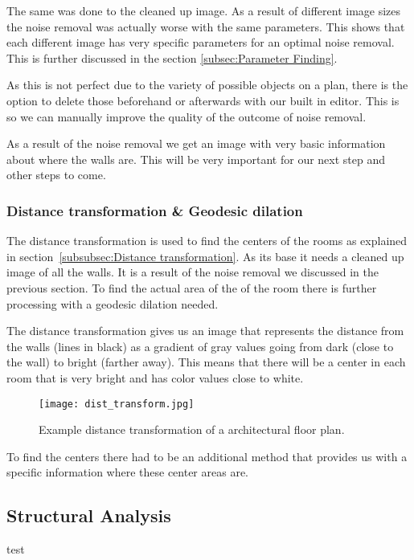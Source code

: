 The same was done to the cleaned up image. As a result of different image sizes the noise removal was actually worse with the same parameters. This shows that each different image has very specific parameters for an optimal noise removal. This is further discussed in the section \ref{subsec:Parameter Finding}.

As this is not perfect due to the variety of possible objects on a plan, there is the option to delete those beforehand or afterwards with our built in editor. This is so we can manually improve the quality of the outcome of noise removal.

As a result of the noise removal we get an image with very basic information about where the walls are. This will be very important for our next step and other steps to come.

\subsubsection{Distance transformation \& Geodesic dilation}
The distance transformation is used to find the centers of the rooms as explained in section~\ref{subsubsec:Distance transformation}. As its base it needs a cleaned up image of all the walls. It is a result of the noise removal we discussed in the previous section. To find the actual area of the of the room there is further processing with a geodesic dilation needed.

The distance transformation gives us an image that represents the distance from the walls (lines in black) as a gradient of gray values going from dark (close to the wall) to bright (farther away). This means that there will be a center in each room that is very bright and has color values close to white.

\begin{figure}[H]
	\centering
	\texttt{[image: dist\_transform.jpg]}
	\caption{Example distance transformation of a architectural floor plan.}
	\label{fig:dist_transform}
\end{figure}

To find the centers there had to be an additional method that provides us with a specific information where these center areas are.
  



\subsection{Structural Analysis}
test
